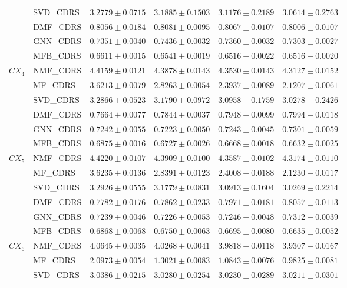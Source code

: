 \documentclass[pdflatex,sn-mathphys-num]{sn-jnl}%
\theoremstyle{thmstyleone}%
\theoremstyle{thmstyletwo}%
\theoremstyle{thmstylethree}%
\begin{document}
\begin{longtable}{llcccc}
 & SVD\_CDRS & $3.2779\pm0.0715$ & $3.1885\pm0.1503$ & $3.1176\pm0.2189$ & $3.0614\pm0.2763$ \\
 & DMF\_CDRS & $0.8056\pm0.0184$ & $0.8081\pm0.0095$ & $0.8067\pm0.0107$ & $0.8006\pm0.0107$ \\
 & GNN\_CDRS & $0.7351\pm0.0040$ & $0.7436\pm0.0032$ & $0.7360\pm0.0032$ & $0.7303\pm0.0027$ \\
 & MFB\_CDRS & $0.6611\pm0.0015$ & $0.6541\pm0.0019$ & $0.6516\pm0.0022$ & $0.6516\pm0.0020$ \\
\midrule
$CX_4$ & NMF\_CDRS & $4.4159\pm0.0121$ & $4.3878\pm0.0143$ & $4.3530\pm0.0143$ & $4.3127\pm0.0152$ \\
 & MF\_CDRS & $3.6213\pm0.0079$ & $2.8263\pm0.0054$ & $2.3937\pm0.0089$ & $2.1207\pm0.0061$ \\
 & SVD\_CDRS & $3.2866\pm0.0523$ & $3.1790\pm0.0972$ & $3.0958\pm0.1759$ & $3.0278\pm0.2426$ \\
 & DMF\_CDRS & $0.7664\pm0.0077$ & $0.7844\pm0.0037$ & $0.7948\pm0.0099$ & $0.7994\pm0.0118$ \\
 & GNN\_CDRS & $0.7242\pm0.0055$ & $0.7223\pm0.0050$ & $0.7243\pm0.0045$ & $0.7301\pm0.0059$ \\
 & MFB\_CDRS & $0.6875\pm0.0016$ & $0.6727\pm0.0026$ & $0.6668\pm0.0018$ & $0.6632\pm0.0025$ \\
\midrule
$CX_5$ & NMF\_CDRS & $4.4220\pm0.0107$ & $4.3909\pm0.0100$ & $4.3587\pm0.0102$ & $4.3174\pm0.0110$ \\
 & MF\_CDRS & $3.6235\pm0.0136$ & $2.8391\pm0.0123$ & $2.4008\pm0.0188$ & $2.1230\pm0.0117$ \\
 & SVD\_CDRS & $3.2926\pm0.0555$ & $3.1779\pm0.0831$ & $3.0913\pm0.1604$ & $3.0269\pm0.2214$ \\
 & DMF\_CDRS & $0.7782\pm0.0176$ & $0.7862\pm0.0233$ & $0.7971\pm0.0181$ & $0.8057\pm0.0113$ \\
 & GNN\_CDRS & $0.7239\pm0.0046$ & $0.7226\pm0.0053$ & $0.7246\pm0.0048$ & $0.7312\pm0.0039$ \\
 & MFB\_CDRS & $0.6868\pm0.0068$ & $0.6750\pm0.0063$ & $0.6695\pm0.0080$ & $0.6635\pm0.0052$ \\
\midrule
$CX_6$ & NMF\_CDRS & $4.0645\pm0.0035$ & $4.0268\pm0.0041$ & $3.9818\pm0.0118$ & $3.9307\pm0.0167$ \\
 & MF\_CDRS & $2.0973\pm0.0054$ & $1.3021\pm0.0083$ & $1.0843\pm0.0076$ & $0.9825\pm0.0081$ \\
 & SVD\_CDRS & $3.0386\pm0.0215$ & $3.0280\pm0.0254$ & $3.0230\pm0.0289$ & $3.0211\pm0.0301$ \\

\end{longtable}
\end{document}
